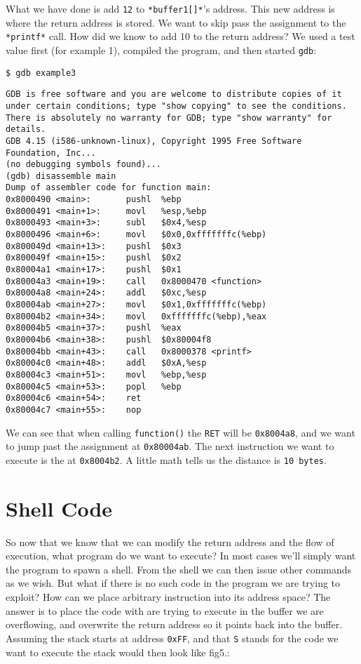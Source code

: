 \documentclass[a4paper]{article}
\begin{document}
What we have done is add \texttt{12} to \texttt{*buffer1[]*}’s address. This new address is where the return address is stored. We want to skip pass the assignment to the \texttt{*printf*} call. How did we know to add 10 to the return address? We used a test value first (for example 1), compiled the program, and then started \texttt{gdb}:

\begin{lstlisting}[style=DOS]
$ gdb example3
\end{lstlisting}

\begin{verbatim}
GDB is free software and you are welcome to distribute copies of it
under certain conditions; type "show copying" to see the conditions.
There is absolutely no warranty for GDB; type "show warranty" for details.
GDB 4.15 (i586-unknown-linux), Copyright 1995 Free Software Foundation, Inc...
(no debugging symbols found)...
(gdb) disassemble main
Dump of assembler code for function main:
0x8000490 <main>:       pushl  %ebp
0x8000491 <main+1>:     movl   %esp,%ebp
0x8000493 <main+3>:     subl   $0x4,%esp
0x8000496 <main+6>:     movl   $0x0,0xfffffffc(%ebp)
0x800049d <main+13>:    pushl  $0x3
0x800049f <main+15>:    pushl  $0x2
0x80004a1 <main+17>:    pushl  $0x1
0x80004a3 <main+19>:    call   0x8000470 <function>
0x80004a8 <main+24>:    addl   $0xc,%esp
0x80004ab <main+27>:    movl   $0x1,0xfffffffc(%ebp)
0x80004b2 <main+34>:    movl   0xfffffffc(%ebp),%eax
0x80004b5 <main+37>:    pushl  %eax
0x80004b6 <main+38>:    pushl  $0x80004f8
0x80004bb <main+43>:    call   0x8000378 <printf>
0x80004c0 <main+48>:    addl   $0xA,%esp
0x80004c3 <main+51>:    movl   %ebp,%esp
0x80004c5 <main+53>:    popl   %ebp
0x80004c6 <main+54>:    ret
0x80004c7 <main+55>:    nop
\end{verbatim}

We can see that when calling \texttt{function()} the \texttt{RET} will be \texttt{0x8004a8}, and we want to jump past the assignment at \texttt{0x80004ab}. The next instruction we want to execute is the at \texttt{0x8004b2}. A little math tells us the distance is \texttt{10 bytes}.



\section{Shell Code}

So now that we know that we can modify the return address and the flow of execution, what program do we want to execute? In most cases we’ll simply want the program to spawn a shell. From the shell we can then issue other commands as we wish. But what if there is no such code in the program we are trying to exploit? How can we place arbitrary instruction into its address space? The answer is to place the code with are trying to execute in the buffer we are overflowing, and overwrite the return address so it points back into the buffer. Assuming the stack starts at address \texttt{0xFF}, and that \texttt{S} stands for the code we want to execute the stack would then look like fig5.:
\end{document}
